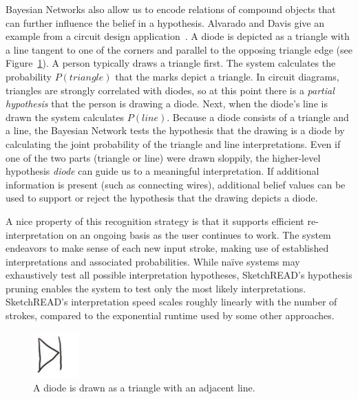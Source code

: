Bayesian Networks also allow us to encode relations of compound
objects that can further influence the belief in a hypothesis.
Alvarado and Davis give an example from a circuit design
application~\cite{alvarado-sketchread-uist}. A diode is depicted as a
triangle with a line tangent to one of the corners and parallel to the
opposing triangle edge (see Figure~\ref{fig:diode}). A person
typically draws a triangle first. The system calculates the
probability $P(triangle)$ that the marks depict a triangle. In circuit
diagrams, triangles are strongly correlated with diodes, so at this
point there is a \textit{partial hypothesis} that the person is
drawing a diode. Next, when the diode's line is drawn the system
calculates $P(line)$. Because a diode consists of a triangle and a
line, the Bayesian Network tests the hypothesis that the drawing is a
diode by calculating the joint probability of the triangle and line
interpretations. Even if one of the two parts (triangle or line) were
drawn sloppily, the higher-level hypothesis \textit{diode} can guide
us to a meaningful interpretation. If additional information is
present (such as connecting wires), additional belief values can be
used to support or reject the hypothesis that the drawing depicts a
diode.

A nice property of this recognition strategy is that it supports
efficient re-interpretation on an ongoing basis as the user continues
to work. The system endeavors to make sense of each new input stroke,
making use of established interpretations and associated
probabilities. While na\"ive systems may exhaustively test all
possible interpretation hypotheses, SketchREAD's hypothesis pruning
enables the system to test only the most likely
interpretations. SketchREAD's interpretation speed scales roughly
linearly with the number of strokes, compared to the exponential
runtime used by some other approaches.

\begin{figure}
\begin{center}
  \includegraphics[angle=0, origin=c, width=0.7in]{img/diode.pdf}
  \caption{A diode is drawn as a triangle with an adjacent line.}
  \label{fig:diode}
\end{center}
\end{figure}

